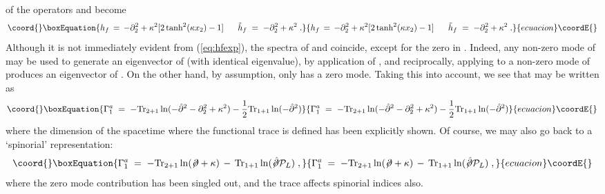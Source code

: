 \documentclass[a4paper,12pt]{article}
\begin{document}
of the operators \coordHE{} and \coordHE{} become
\begin{equation}\coord{}\boxEquation{
  \label{eq:hfexp} 
h_f\,=\, -\partial_2^2 + \kappa^2 [ 2 \tanh^2(\kappa x_2) - 1]
\;\;\;\;\;\;
{\tilde h}_f\;=\; -\partial_2^2 + \kappa^2 \;.
}{
  h_f\,=\, -\partial_2^2 + \kappa^2 [ 2 \tanh^2(\kappa x_2) - 1]
\;\;\;\;\;\;
{\tilde h}_f\;=\; -\partial_2^2 + \kappa^2 \;.
}{ecuacion}\coordE{}\end{equation}
Although it is not immediately evident from (\ref{eq:hfexp}), the 
spectra of \coordHE{} and \coordHE{} coincide, except for the zero in \coordHE{}.
Indeed, any non-zero mode of \coordHE{} may be used to generate an 
eigenvector of \coordHE{} (with identical eigenvalue), by application of 
\coordHE{}, and reciprocally, applying \coordHE{} to a non-zero mode of \coordHE{}
produces an eigenvector of \coordHE{}. On the other hand, by 
assumption, only \coordHE{} has a zero mode.  
Taking this into account, we see that \coordHE{} may be written as
\begin{equation}\coord{}\boxEquation{
\Gamma_1^a \;=\; -{\rm Tr}_{2+1}\ln(-{\hat \partial}^2 - \partial_2^2 + \kappa^2) 
- \frac{1}{2} {\rm Tr}_{1+1}\ln(-{\hat\partial}^2) 
}{
\Gamma_1^a \;=\; -{\rm Tr}_{2+1}\ln(-{\hat \partial}^2 - \partial_2^2 + \kappa^2) 
- \frac{1}{2} {\rm Tr}_{1+1}\ln(-{\hat\partial}^2) 
}{ecuacion}\coordE{}\end{equation}
where the dimension of the spacetime where the functional trace is defined has
been explicitly shown. Of course, we may also go back to a `spinorial' 
representation:
\begin{equation}\coord{}\boxEquation{
\Gamma_1^a \;=\; -{\rm Tr}_{2+1}\ln(\not\!\partial + \kappa) \,
-\,{\rm Tr}_{1+1}\ln(\not\!{\hat \partial}{\mathcal P}_L) \;, 
}{
\Gamma_1^a \;=\; -{\rm Tr}_{2+1}\ln(\not\!\partial + \kappa) \,
-\,{\rm Tr}_{1+1}\ln(\not\!{\hat \partial}{\mathcal P}_L) \;, 
}{ecuacion}\coordE{}\end{equation}
where the zero mode contribution has been singled out, and the trace 
affects spinorial indices also.    
\end{document}
